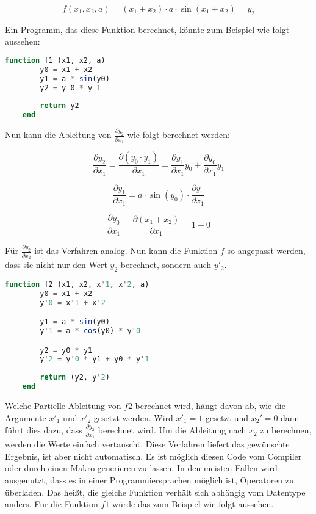 $$
f(x_1, x_2, a) = (x_1 + x_2) \cdot a \cdot \sin(x_1 + x_2) = y_2
$$

Ein Programm, das diese Funktion berechnet, könnte zum Beispiel wie folgt aussehen:

\begin{lstlisting}[language=Julia]
    function f1 (x1, x2, a)
        y0 = x1 + x2
        y1 = a * sin(y0)
        y2 = y_0 * y_1
        
    	return y2
    end
\end{lstlisting}

Nun kann die Ableitung von $\frac{\partial y_2}{\partial x_1}$ wie folgt berechnet werden:

$$
	\frac{\partial y_2}{\partial x_1} = \frac{\partial (y_0 \cdot y_1)}{\partial x_1} = \frac{\partial  y_1}{\partial x_1} y_0  + \frac{\partial y_0 }{\partial x_1} y_1
$$

$$
	\frac{\partial y_1}{ \partial x_1 } = a \cdot \sin(y_0) \cdot \frac{\partial y_0}{\partial x_1}
$$

$$
	\frac{\partial y_0}{\partial x_1} = \frac{\partial (x_1 + x_2)}{\partial x_1} = 1 + 0
$$

Für $\frac{\partial y_2}{\partial x_2}$ ist das Verfahren analog. 
Nun kann die Funktion $f$ so angepasst werden, dass sie nicht nur den Wert $y_2$ berechnet, sondern auch $y'_2$.

\begin{lstlisting}[language=Julia]
    function f2 (x1, x2, x'1, x'2, a)
        y0 = x1 + x2
        y'0 = x'1 + x'2

        y1 = a * sin(y0)
        y'1 = a * cos(y0) * y'0

		y2 = y0 * y1
        y'2 = y'0 * y1 + y0 * y'1
        
        return (y2, y'2)
    end
\end{lstlisting}

Welche Partielle-Ableitung von $f2$ berechnet wird, hängt davon ab, wie die Argumente $x'_1$ und $x'_2$ gesetzt werden.
Wird $x'_1 = 1$ gesetzt und $x_2' = 0$ dann führt dies dazu, dass $\frac{\partial y_2}{\partial x_1}$ berechnet wird.
Um die Ableitung nach $x_2$ zu berechnen, werden die Werte einfach vertauscht.
Diese Verfahren liefert das gewünschte Ergebnis, ist aber nicht automatisch.
Es ist möglich diesen Code vom Compiler oder durch einen Makro generieren zu lassen.
In den meisten Fällen wird ausgenutzt, dass es in einer 
Programmiersprachen möglich ist, Operatoren zu überladen.
Das heißt, die gleiche Funktion verhält sich abhängig vom Datentype anders.
Für die Funktion $f1$ würde das zum Beispiel wie folgt aussehen.

